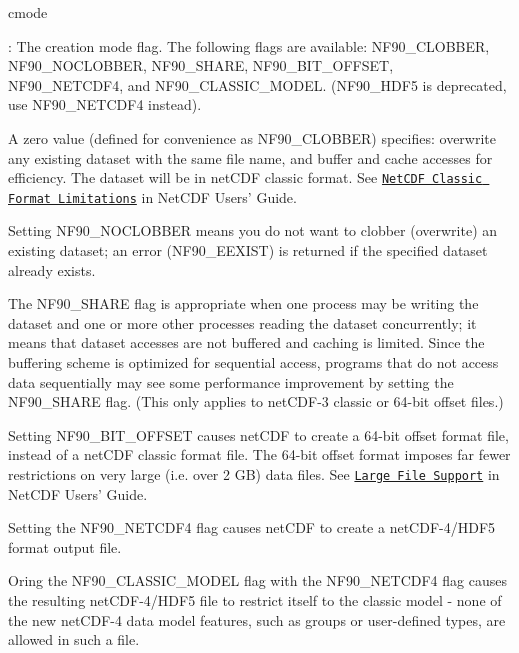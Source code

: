 {\ttfamily cmode}

\+: The creation mode flag. The following flags are available\+: N\+F90\+\_\+\+C\+L\+O\+B\+B\+ER, N\+F90\+\_\+\+N\+O\+C\+L\+O\+B\+B\+ER, N\+F90\+\_\+\+S\+H\+A\+RE, N\+F90\+\_\+B\+I\+T\+\_\+\+O\+F\+F\+S\+ET, N\+F90\+\_\+\+N\+E\+T\+C\+D\+F4, and N\+F90\+\_\+\+C\+L\+A\+S\+S\+I\+C\+\_\+\+M\+O\+D\+EL. (N\+F90\+\_\+\+H\+D\+F5 is deprecated, use N\+F90\+\_\+\+N\+E\+T\+C\+D\+F4 instead).

A zero value (defined for convenience as N\+F90\+\_\+\+C\+L\+O\+B\+B\+ER) specifies\+: overwrite any existing dataset with the same file name, and buffer and cache accesses for efficiency. The dataset will be in net\+C\+DF classic format. See \href{netcdf.html#NetCDF-Classic-Format-Limitations}{\tt Net\+C\+DF Classic Format Limitations} in Net\+C\+DF Users’ Guide.

Setting N\+F90\+\_\+\+N\+O\+C\+L\+O\+B\+B\+ER means you do not want to clobber (overwrite) an existing dataset; an error (N\+F90\+\_\+\+E\+E\+X\+I\+ST) is returned if the specified dataset already exists.

The N\+F90\+\_\+\+S\+H\+A\+RE flag is appropriate when one process may be writing the dataset and one or more other processes reading the dataset concurrently; it means that dataset accesses are not buffered and caching is limited. Since the buffering scheme is optimized for sequential access, programs that do not access data sequentially may see some performance improvement by setting the N\+F90\+\_\+\+S\+H\+A\+RE flag. (This only applies to net\+C\+D\+F-\/3 classic or 64-\/bit offset files.)

Setting N\+F90\+\_\+B\+I\+T\+\_\+\+O\+F\+F\+S\+ET causes net\+C\+DF to create a 64-\/bit offset format file, instead of a net\+C\+DF classic format file. The 64-\/bit offset format imposes far fewer restrictions on very large (i.\+e. over 2 GB) data files. See \href{netcdf.html#Large-File-Support}{\tt Large File Support} in Net\+C\+DF Users’ Guide.

Setting the N\+F90\+\_\+\+N\+E\+T\+C\+D\+F4 flag causes net\+C\+DF to create a net\+C\+D\+F-\/4/\+H\+D\+F5 format output file.

Oring the N\+F90\+\_\+\+C\+L\+A\+S\+S\+I\+C\+\_\+\+M\+O\+D\+EL flag with the N\+F90\+\_\+\+N\+E\+T\+C\+D\+F4 flag causes the resulting net\+C\+D\+F-\/4/\+H\+D\+F5 file to restrict itself to the classic model -\/ none of the new net\+C\+D\+F-\/4 data model features, such as groups or user-\/defined types, are allowed in such a file.

